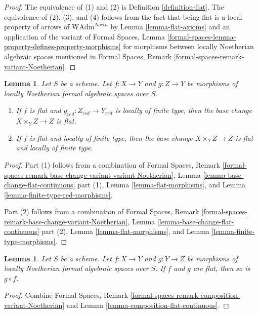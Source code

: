 \documentclass{stacks-project}
\theoremstyle{plain}
\newtheorem{lemma}[subsection]{Lemma}
\theoremstyle{definition}
\theoremstyle{remark}
\numberwithin{equation}{subsection}
\begin{document}
\begin{proof}
The equivalence of (1) and (2) is Definition \ref{definition-flat}.
The equivalence of (2), (3), and (4) follows from the fact that
being flat is a local property of arrows of
$\text{WAdm}^{Noeth}$ by Lemma \ref{lemma-flat-axioms}
and an application of the variant of
Formal Spaces, Lemma
\ref{formal-spaces-lemma-property-defines-property-morphisms}
for morphisms between locally Noetherian algebraic spaces
mentioned in
Formal Spaces, Remark
\ref{formal-spaces-remark-variant-Noetherian}.
\end{proof}

\begin{lemma}
\label{lemma-base-change-flat}
Let $S$ be a scheme. Let $f : X \to Y$ and $g : Z \to Y$
be morphisms of locally Noetherian formal algebraic spaces over $S$.
\begin{enumerate}
\item If $f$ is flat and $g_{red} : Z_{red} \to Y_{red}$ is
locally of finite type, then the base change
$X \times_Y Z \to Z$ is flat.
\item If $f$ is flat and locally of finite type, then
the base change $X \times_Y Z \to Z$ is flat and locally of finite type.
\end{enumerate}
\end{lemma}

\begin{proof}
Part (1) follows from a combination of
Formal Spaces, Remark
\ref{formal-spaces-remark-base-change-variant-variant-Noetherian},
Lemma \ref{lemma-base-change-flat-continuous} part (1),
Lemma \ref{lemma-flat-morphisms}, and
Lemma \ref{lemma-finite-type-red-morphisms}.

\medskip\noindent
Part (2) follows from a combination of
Formal Spaces, Remark
\ref{formal-spaces-remark-base-change-variant-Noetherian},
Lemma \ref{lemma-base-change-flat-continuous} part (2),
Lemma \ref{lemma-flat-morphisms}, and
Lemma \ref{lemma-finite-type-morphisms}.
\end{proof}

\begin{lemma}
\label{lemma-composition-flat}
Let $S$ be a scheme. Let $f : X \to Y$ and $g : Y \to Z$
be morphisms of locally Noetherian formal algebraic spaces over $S$.
If $f$ and $g$ are flat, then so is $g \circ f$.
\end{lemma}

\begin{proof}
Combine Formal Spaces, Remark
\ref{formal-spaces-remark-composition-variant-Noetherian}
and Lemma \ref{lemma-composition-flat-continuous}.
\end{proof}
\end{document}
